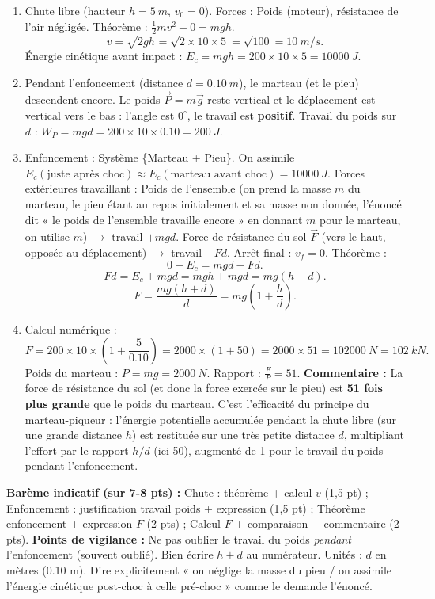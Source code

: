 \documentclass[11pt]{article}
\begin{document}
\begin{corrige}
\begin{enumerate}
\item Chute libre (hauteur $h = \SI{5}{m}$, $v_0 = 0$). Forces : Poids (moteur), résistance de l'air négligée.
Théorème : $\frac{1}{2}mv^2 - 0 = mgh$.
\[
v = \sqrt{2gh} = \sqrt{2 \times 10 \times 5} = \sqrt{100} = \SI{10}{m/s}.
\]
Énergie cinétique avant impact : $E_c = mgh = 200 \times 10 \times 5 = \SI{10000}{J}$.
\item Pendant l'enfoncement (distance $d = \SI{0,10}{m}$), le marteau (et le pieu) descendent encore. Le poids $\vec{P} = m\vec{g}$ reste vertical et le déplacement est vertical vers le bas : l'angle est $0^{\circ}$, le travail est \textbf{positif}.
Travail du poids sur $d$ : $W_P = mgd = 200 \times 10 \times \num{0,10} = \SI{200}{J}$.
\item Enfoncement : Système \{Marteau + Pieu\}. On assimile $E_c(\text{juste après choc}) \approx E_c(\text{marteau avant choc}) = \SI{10000}{J}$.
Forces extérieures travaillant : Poids de l'ensemble (on prend la masse $m$ du marteau, le pieu étant au repos initialement et sa masse non donnée, l'énoncé dit « le poids de l'ensemble travaille encore » en donnant $m$ pour le marteau, on utilise $m$) $\to$ travail $+mgd$. Force de résistance du sol $\vec{F}$ (vers le haut, opposée au déplacement) $\to$ travail $-Fd$.
Arrêt final : $v_f = 0$.
Théorème :
\[
0 - E_c = mgd - Fd.
\]
\[
Fd = E_c + mgd = mgh + mgd = mg(h+d).
\]
\[
F = \frac{mg(h+d)}{d} = mg\left(1 + \frac{h}{d}\right).
\]
\item Calcul numérique :
\[
F = 200 \times 10 \times \left(1 + \frac{5}{\num{0,10}}\right) = 2000 \times (1 + 50) = 2000 \times 51 = \SI{102000}{N} = \SI{102}{kN}.
\]
Poids du marteau : $P = mg = \SI{2000}{N}$.
Rapport : $\frac{F}{P} = 51$.
\textbf{Commentaire :} La force de résistance du sol (et donc la force exercée sur le pieu) est \textbf{51 fois plus grande} que le poids du marteau. C'est l'efficacité du principe du marteau-piqueur : l'énergie potentielle accumulée pendant la chute libre (sur une grande distance $h$) est restituée sur une très petite distance $d$, multipliant l'effort par le rapport $h/d$ (ici 50), augmenté de 1 pour le travail du poids pendant l'enfoncement.
\end{enumerate}
\textbf{Barème indicatif (sur 7-8 pts) :} Chute : théorème + calcul $v$ (1,5 pt) ; Enfoncement : justification travail poids + expression (1,5 pt) ; Théorème enfoncement + expression $F$ (2 pts) ; Calcul $F$ + comparaison + commentaire (2 pts).
\textbf{Points de vigilance :} Ne pas oublier le travail du poids \emph{pendant} l'enfoncement (souvent oublié). Bien écrire $h+d$ au numérateur. Unités : $d$ en mètres (\num{0,10} m). Dire explicitement « on néglige la masse du pieu / on assimile l'énergie cinétique post-choc à celle pré-choc » comme le demande l'énoncé.
\end{corrige}
\end{document}
